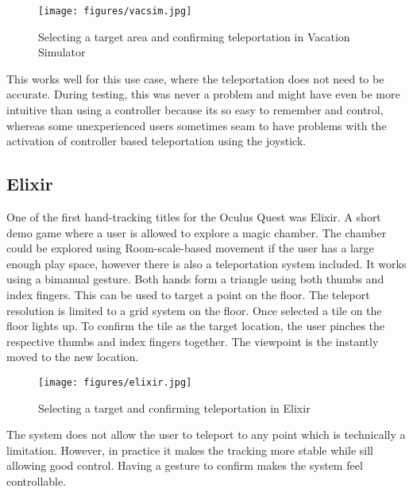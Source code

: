 \begin{figure}[hbt!]
  \centering
  \texttt{[image: figures/vacsim.jpg]}
  \caption{Selecting a target area and confirming teleportation in Vacation Simulator}
  \label{fig:pull}
\end{figure}

This works well for this use case, where the teleportation does not need to be accurate. During testing, this was never a problem and might have even be more intuitive than using a controller because its so easy to remember and control, whereas some unexperienced users sometimes seam to have problems with the activation of controller based teleportation using the joystick. 


\subsection{Elixir}
One of the first hand-tracking titles for the Oculus Quest was Elixir. A short demo game where a user is allowed to explore a magic chamber. The chamber could be explored using Room-scale-based movement if the user has a large enough play space, however there is also a teleportation system included. It works using a bimanual gesture. Both hands form a triangle using both thumbs and index fingers. This can be used to target a point on the floor. The teleport resolution is limited to a grid system on the floor. Once selected a tile on the floor lights up. To confirm the tile as the target location, the user pinches the respective thumbs and index fingers together. The viewpoint is the instantly moved to the new location.

\begin{figure}[hbt!]
  \centering
  \texttt{[image: figures/elixir.jpg]}
  \caption{Selecting a target and confirming teleportation in Elixir}
  \label{fig:elixir}
\end{figure}

The system does not allow the user to teleport to any point which is technically a limitation. However, in practice it makes the tracking more stable while sill allowing good control. Having a gesture to confirm makes the system feel controllable. 


